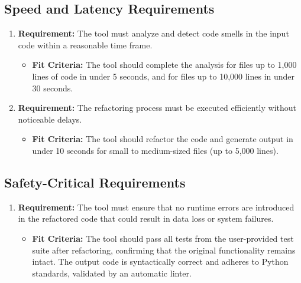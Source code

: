 \documentclass[12pt]{article}
\begin{document}
\subsection{Speed and Latency Requirements}
\begin{enumerate}
  \item \textbf{Requirement:} The tool must analyze and detect code smells in the input code within a reasonable time frame.
  \begin{itemize}[label={}]
      \item \textbf{Fit Criteria:} The tool should complete the analysis for files up to 1,000 lines of code in under 5 seconds, and for files up to 10,000 lines in under 30 seconds.
  \end{itemize}
  \item \textbf{Requirement:} The refactoring process must be executed efficiently without noticeable delays.
  \begin{itemize}[label={}]
      \item \textbf{Fit Criteria:}  The tool should refactor the code and generate output in under 10 seconds for small to medium-sized files (up to 5,000 lines).
  \end{itemize}
\end{enumerate}

\subsection{Safety-Critical Requirements}
\begin{enumerate}
  \item \textbf{Requirement:} The tool must ensure that no runtime errors are introduced in the refactored code that could result in data loss or system failures.
  \begin{itemize}[label={}]
      \item \textbf{Fit Criteria:} The tool should pass all tests from the user-provided test suite after refactoring, confirming that the original functionality remains intact. The output code is syntactically correct and adheres to Python standards, validated by an automatic linter.
  \end{itemize}
\end{enumerate}
\end{document}
